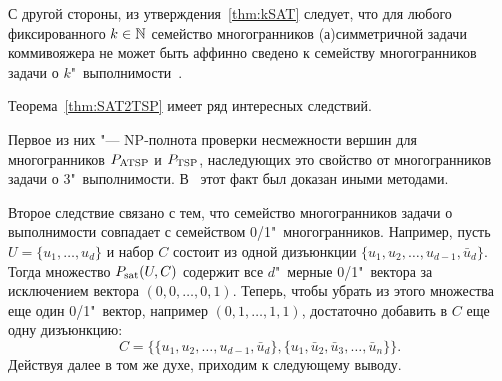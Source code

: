 

С другой стороны, из утверждения~\ref{thm:kSAT} следует, что для любого фиксированного $k \in \mathbb{N}$ семейство многогранников (а)симметричной задачи коммивояжера не может быть аффинно сведено к семейству многогранников задачи о $k$"~выполнимости~\cite{Fiorini:2003}.

Теорема~\ref{thm:SAT2TSP} имеет ряд интересных следствий.

Первое из них "--- NP-полнота проверки несмежности вершин для многогранников $P_{\textup{ATSP}}$ и $P_{\textup{TSP}}$, наследующих это свойство от многогранников задачи о 3"~выполнимости. В~\cite{Papadimitriou:1978} этот факт был доказан иными методами.

Второе следствие связано с тем, что семейство многогранников задачи о выполнимости совпадает с семейством 0/1"~многогранников.
Например, пусть $U = \{u_1, \dots, u_d\}$ и набор $C$ состоит из одной дизъюнкции
$\{u_1, u_2, \ldots, u_{d-1}, \bar{u}_d\}$.
Тогда множество $P_{\textup{sat}}(U,C)$ содержит все $d$"~мерные 0/1"~вектора за исключением вектора $(0, 0, \ldots, 0, 1)$.
Теперь, чтобы убрать из этого множества еще один 0/1"~вектор, например
$(0, 1, \ldots, 1, 1)$, достаточно добавить в $C$ еще одну дизъюнкцию:
$$
C = \bigl\{\{u_1, u_2, \ldots, u_{d-1}, \bar{u}_d\},
\{u_1, \bar{u}_2, \bar{u}_3, \ldots, \bar{u}_n\}\bigr\}.
$$ 
Действуя далее в том же духе, приходим к следующему выводу.


